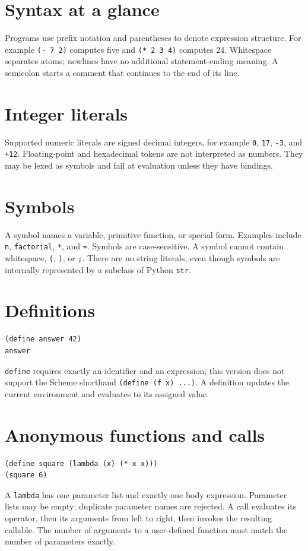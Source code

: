 \documentclass[11pt,a4paper,oneside]{report}
\begin{document}
\section{Syntax at a glance}
Programs use prefix notation and parentheses to denote expression structure. For example \texttt{(- 7 2)} computes five and \texttt{(* 2 3 4)} computes 24. Whitespace separates atoms; newlines have no additional statement-ending meaning. A semicolon starts a comment that continues to the end of its line.
\section{Integer literals}
Supported numeric literals are signed decimal integers, for example \texttt{0}, \texttt{17}, \texttt{-3}, and \texttt{+12}. Floating-point and hexadecimal tokens are not interpreted as numbers. They may be lexed as symbols and fail at evaluation unless they have bindings.
\section{Symbols}
A symbol names a variable, primitive function, or special form. Examples include \texttt{n}, \texttt{factorial}, \texttt{*}, and \texttt{=}. Symbols are case-sensitive. A symbol cannot contain whitespace, \texttt{(}, \texttt{)}, or \texttt{;}. There are no string literals, even though symbols are internally represented by a subclass of Python \texttt{str}.
\section{Definitions}
\begin{lstlisting}
(define answer 42)
answer
\end{lstlisting}
\texttt{define} requires exactly an identifier and an expression; this version does not support the Scheme shorthand \texttt{(define (f x) ...)}. A definition updates the current environment and evaluates to its assigned value.
\section{Anonymous functions and calls}
\begin{lstlisting}
(define square (lambda (x) (* x x)))
(square 6)
\end{lstlisting}
A \texttt{lambda} has one parameter list and exactly one body expression. Parameter lists may be empty; duplicate parameter names are rejected. A call evaluates its operator, then its arguments from left to right, then invokes the resulting callable. The number of arguments to a user-defined function must match the number of parameters exactly.
\end{document}
